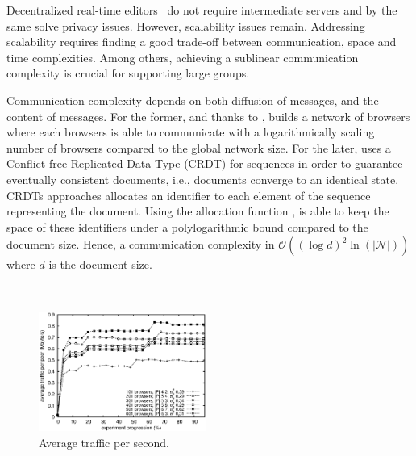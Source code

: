 Decentralized real-time editors~\cite{oster2006data, sun1998operational,
  sun2009contextbased} do not require intermediate servers and by the same solve
privacy issues. However, scalability issues remain.  Addressing scalability
requires finding a good trade-off between communication, space and time
complexities. Among others, achieving a sublinear communication complexity is
crucial for supporting large groups.

Communication complexity depends on both diffusion of messages, and the content
of messages. For the former, and thanks to \SPRAY, \CRATE builds a network of
browsers where each browsers is able to communicate with a logarithmically
scaling number of browsers compared to the global network size. For the later,
\CRATE uses a Conflict-free Replicated Data Type (CRDT) for sequences in order
to guarantee eventually consistent documents, i.e., documents converge to an
identical state. CRDTs approaches allocates an identifier to each element of the
sequence representing the document. Using the allocation function \LSEQ, \CRATE
is able to keep the space of these identifiers under a polylogarithmic bound
compared to the document size. Hence, a communication complexity in
$\mathcal{O}((\log d)^2\ln(|\mathcal{N}|))$ where $d$ is the document size.


\ \\

\begin{figure}
  \centering
  \includegraphics[width=0.49\textwidth]{img/traffic.eps}
  \caption{\label{fig:traffic}Average traffic per second.}
\end{figure}


